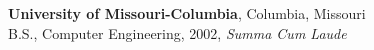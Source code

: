 \documentclass[margin,line]{res}
\newenvironment{list1}{
  \begin{list}{\ding{113}}{%
      \setlength{\itemsep}{0in}
      \setlength{\parsep}{0in} \setlength{\parskip}{0in}
      \setlength{\topsep}{0in} \setlength{\partopsep}{0in}
      \setlength{\leftmargin}{0.17in}}}{\end{list}}
\newenvironment{list2}{
  \begin{list}{$\bullet$}{%
      \setlength{\itemsep}{0in}
      \setlength{\parsep}{0in} \setlength{\parskip}{0in}
      \setlength{\topsep}{0in} \setlength{\partopsep}{0in}
      \setlength{\leftmargin}{0.2in}}}{\end{list}}
\begin{document}
\begin{resume}

{\bf University of Missouri-Columbia}, Columbia, Missouri\\
B.S., Computer Engineering, 2002, \em Summa Cum Laude\em


\end{resume}
\end{document}
